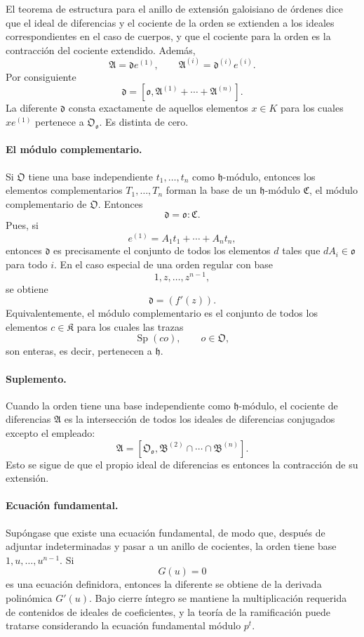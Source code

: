 El teorema de estructura para el anillo de extensión galoisiano de órdenes dice que el ideal de diferencias y el cociente de la orden se extienden a los ideales correspondientes en el caso de cuerpos, y que el cociente para la orden es la contracción del cociente extendido. Además,
\[
        \mathfrak A=\mathfrak d e^{(1)},
        \qquad
        \mathfrak A^{(i)}=\mathfrak d^{(i)}e^{(i)}.
\]
Por consiguiente
\[
        \mathfrak d=[\mathfrak o,
        \mathfrak A^{(1)}+
        \cdots+\mathfrak A^{(n)}].
\]
La diferente $\mathfrak d$ consta exactamente de aquellos elementos $x\in K$ para los cuales $xe^{(1)}$ pertenece a $\mathfrak O_{\mathfrak o}$. Es distinta de cero.

\paragraph{El módulo complementario.}
Si $\mathfrak O$ tiene una base independiente $t_1,\ldots,t_n$ como $\mathfrak h$-módulo, entonces los elementos complementarios $T_1,\ldots,T_n$ forman la base de un $\mathfrak h$-módulo $\mathfrak C$, el módulo complementario de $\mathfrak O$. Entonces
\[
        \mathfrak d=\mathfrak o:\mathfrak C.
\]
Pues, si
\[
        e^{(1)}=A_1t_1+
        \cdots+A_nt_n,
\]
entonces $\mathfrak d$ es precisamente el conjunto de todos los elementos $d$ tales que $dA_i\in\mathfrak o$ para todo $i$. En el caso especial de una orden regular con base
\[
        1,z,\ldots,z^{n-1},
\]
se obtiene
\[
        \mathfrak d=(f'(z)).
\]
Equivalentemente, el módulo complementario es el conjunto de todos los elementos $c\in\mathfrak K$ para los cuales las trazas
\[
        \operatorname{Sp}(co),\qquad o\in\mathfrak O,
\]
son enteras, es decir, pertenecen a $\mathfrak h$.

\paragraph{Suplemento.}
Cuando la orden tiene una base independiente como $\mathfrak h$-módulo, el cociente de diferencias $\mathfrak A$ es la intersección de todos los ideales de diferencias conjugados excepto el empleado:
\[
        \mathfrak A=[\mathfrak O_{\mathfrak o},
        \mathfrak B^{(2)}\cap\cdots\cap\mathfrak B^{(n)}].
\]
Esto se sigue de que el propio ideal de diferencias es entonces la contracción de su extensión.

\paragraph{Ecuación fundamental.}
Supóngase que existe una ecuación fundamental, de modo que, después de adjuntar indeterminadas y pasar a un anillo de cocientes, la orden tiene base $1,u,\ldots,u^{n-1}$. Si
\[
        G(u)=0
\]
es una ecuación definidora, entonces la diferente se obtiene de la derivada polinómica $G'(u)$. Bajo cierre íntegro se mantiene la multiplicación requerida de contenidos de ideales de coeficientes, y la teoría de la ramificación puede tratarse considerando la ecuación fundamental módulo $p^t$.

